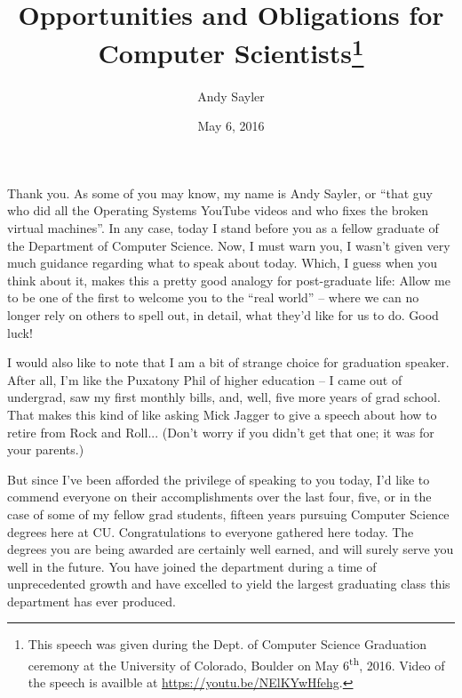 \documentclass[11pt,twocolumn,letterpaper]{article}
\begin{document}
\title{Opportunities and Obligations for Computer
  Scientists\footnote{This speech was given during the Dept. of
    Computer Science Graduation ceremony at the University of
    Colorado, Boulder on May 6\textsuperscript{th}, 2016. Video of the
    speech is availble at \url{https://youtu.be/NElKYwHfehg}.}}

\author{Andy Sayler}

\date{May 6, 2016}

\maketitle

Thank you. As some of you may know, my name is Andy Sayler, or ``that
guy who did all the Operating Systems YouTube videos and who fixes the
broken virtual machines''. In any case, today I stand before you as a
fellow graduate of the Department of Computer Science. Now, I must
warn you, I wasn't given very much guidance regarding what to speak
about today. Which, I guess when you think about it, makes this a
pretty good analogy for post-graduate life: Allow me to be one of the
first to welcome you to the ``real world'' -- where we can no longer
rely on others to spell out, in detail, what they'd like for us to
do. Good luck!

I would also like to note that I am a bit of strange choice for
graduation speaker. After all, I'm like the Puxatony Phil of higher
education -- I came out of undergrad, saw my first monthly bills, and,
well, five more years of grad school. That makes this kind of like
asking Mick Jagger to give a speech about how to retire from Rock and
Roll... (Don't worry if you didn't get that one; it was for your
parents.)

But since I've been afforded the privilege of speaking to you today,
I'd like to commend everyone on their accomplishments over the last
four, five, or in the case of some of my fellow grad students, fifteen
years pursuing Computer Science degrees here at CU. Congratulations to
everyone gathered here today. The degrees you are being awarded are
certainly well earned, and will surely serve you well in the
future. You have joined the department during a time of unprecedented
growth and have excelled to yield the largest graduating class this
department has ever produced.
\end{document}
